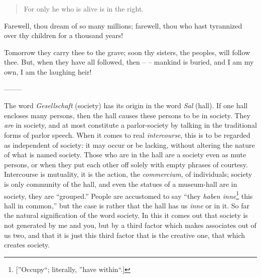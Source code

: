 \begin{quotation}

\noindent{}For only he who is alive is in the right.\end{quotation}

\noindent{}Farewell, thou dream of so many millions; farewell, thou who hast 
tyrannized over thy children for a thousand years!

Tomorrow they carry thee to the grave; soon thy sisters, the peoples, will 
follow thee. But, when they have all followed, then -- -- mankind is buried, 
and I am my own, I am the laughing heir!

\begin{center}
--------\end{center}


The word \textit{Gesellschaft} (society) has its origin in the word 
\textit{Sal} (hall). If one hall encloses many persons, then the hall causes 
these persons to be in society. They \textit{are} in society, and at most 
constitute a parlor-society by talking in the traditional forms of parlor 
speech. When it comes to real \textit{intercourse}, this is to be regarded as 
independent of society: it may occur or be lacking, without altering the 
nature of what is named society. Those who are in the hall are a society even 
as mute persons, or when they put each other off solely with empty phrases of 
courtesy. Intercourse is mutuality, it is the action, the \textit{commercium}, 
of individuals; society is only community of the hall, and even the statues of 
a museum-hall are in society, they are ``grouped.'' People are accustomed to 
say ``they \textit{haben inne}\footnote{[''Occupy``; literally, ''have 
within``.]} this hall in common,'' but the case is rather that the hall has 
us \textit{inne} or in it. So far the natural signification of the word 
society. In this it comes out that society is not generated by me and you, but 
by a third factor which makes associates out of us two, and that it is just 
this third factor that is the creative one, that which creates society.

